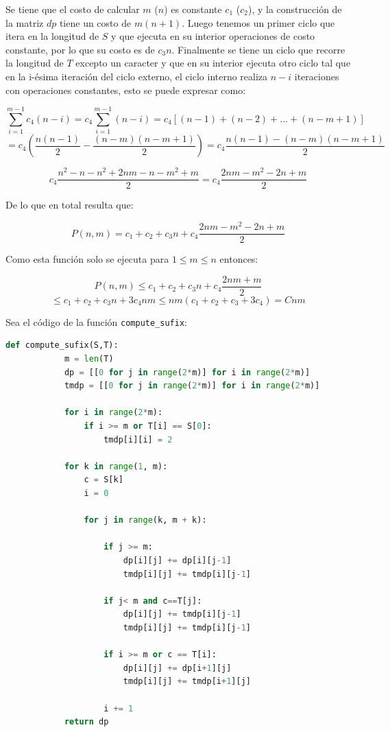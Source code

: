 \documentclass[a4paper]{article}
\begin{document}
    Se tiene que el costo de calcular $m$ ($n$) es constante $c_1$ ($c_2$), y la construcci\'on de la matriz $dp$ tiene un costo de 
    $m(n+1)$. Luego tenemos un primer ciclo que itera en la longitud de $S$ y que ejecuta en su interior operaciones de 
    costo constante, por lo que su costo es de $c_3n$. Finalmente se tiene un ciclo que recorre la longitud de $T$ excepto un caracter y que 
    en su interior ejecuta otro ciclo tal que en la i-\'esima iteraci\'on del ciclo externo, el ciclo interno realiza $n-i$ iteraciones con operaciones constantes, esto se puede expresar como:

    $$\sum_{i=1}^{m-1} c_4(n-i) = c_4\sum_{i=1}^{m-1} (n-i) = c_4 [ (n-1) + (n-2) + ... + (n-m +1)] $$ 
    $$ = c_4 \left( \frac{n(n-1)}{2} - \frac{(n-m)(n-m+1)}{2} \right) = c_4 \frac{n(n-1) - (n-m)(n-m+1)}{2} $$

    $$ c_4\frac{n^2 - n - n^2 + 2nm - n - m^2 + m}{2} = c_4 \frac{2nm - m^2 - 2n + m}{2}$$
            
    De lo que en total resulta que:

    $$P(n,m) = c_1 + c_2 + c_3n + c_4 \frac{2nm - m^2 - 2n + m}{2}$$

    Como esta funci\'on solo se ejecuta para $ 1 \leq m\leq n $ entonces:

    $$P(n,m) \leq c_1 + c_2 + c_3n + c_4 \frac{2nm + m}{2}$$
     $$ \leq c_1 + c_2 + c_3n + 3c_4nm \leq nm(c_1 + c_2 + c_3+ 3c_4) = Cnm$$

    Sea el c\'odigo de la funci\'on \texttt{compute\_sufix}: 

    \begin{lstlisting}[language=Python]
        def compute_sufix(S,T):
            m = len(T)
            dp = [[0 for j in range(2*m)] for i in range(2*m)]
            tmdp = [[0 for j in range(2*m)] for i in range(2*m)]
                    
            for i in range(2*m):
                if i >= m or T[i] == S[0]:
                    tmdp[i][i] = 2
                
            for k in range(1, m):    
                c = S[k]
                i = 0        
            
                for j in range(k, m + k):

                    if j >= m:
                        dp[i][j] += dp[i][j-1]
                        tmdp[i][j] += tmdp[i][j-1]          
                
                    if j< m and c==T[j]:
                        dp[i][j] += tmdp[i][j-1]
                        tmdp[i][j] += tmdp[i][j-1]
                
                    if i >= m or c == T[i]:
                        dp[i][j] += dp[i+1][j]
                        tmdp[i][j] += tmdp[i+1][j]

                    i += 1  
            return dp  
    \end{lstlisting}
\end{document}
